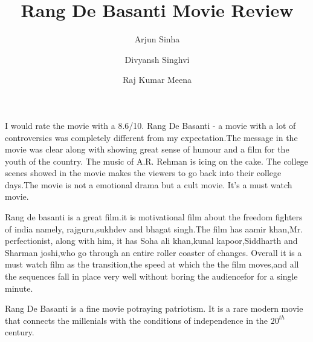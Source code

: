 \documentclass{article}
\title{Rang De Basanti Movie Review}
\author{Arjun Sinha
	\and
	Divyansh Singhvi
	\and
Raj Kumar Meena}
\begin{document}
\maketitle
I would rate the movie with a 8.6/10. Rang De Basanti - a movie with a lot of controversies was completely different from my expectation.The message in the movie was clear along with showing great sense of humour  and a film for the youth of the country. The music of A.R. Rehman is icing on the cake. The college scenes showed in the movie makes the viewers to go back into their college days.The movie is not a emotional drama but a cult movie. It's a must watch movie. 

Rang de basanti is a great film.it is motivational film about the freedom fighters of india namely, rajguru,sukhdev and bhagat singh.The film has aamir khan,Mr. perfectionist, along with him, it has Soha ali khan,kunal kapoor,Siddharth and Sharman joshi,who go through an entire roller coaster of changes.
Overall it is a must watch film as the transition,the speed at which the the film moves,and all the sequences fall in place very well without boring the audiencefor for a single minute.

Rang De Basanti is a fine movie potraying patriotism. It is a rare modern movie that connects the millenials with the conditions of independence in the 
$20^{th}$ century.
\end{document}
